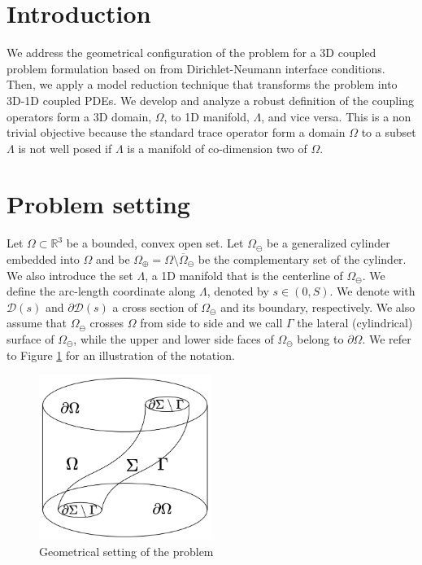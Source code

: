 \documentclass[r]{siamart171218}
\begin{document}
\section{Introduction}\label{sec:intro}

We address the geometrical configuration of the problem for a 3D coupled problem formulation based on from Dirichlet-Neumann interface conditions. Then, we apply a model reduction technique that transforms the problem into 3D-1D coupled PDEs. We develop and analyze a robust definition of the coupling operators form a 3D domain, $\Omega$, to 1D manifold, $\Lambda$, and vice versa. This is a non trivial objective because the standard trace operator form a domain $\Omega$ to a subset $\Lambda$ is not well posed if $\Lambda$ is a manifold of co-dimension two of $\Omega$.

\section{Problem setting}\label{sec:setting}

Let $\Omega \subset \mathbb{R}^3$ be a bounded, convex open set. Let $\Omega_\ominus$ be a generalized cylinder embedded into $\Omega$ and be $\Omega_\oplus = \Omega \setminus \overline{\Omega}_\ominus$ be the complementary set of the cylinder. We also introduce the set $\Lambda$, a 1D manifold that is the centerline of $\Omega_\ominus$. We define the arc-length coordinate along $\Lambda$, denoted by $s \in (0,S)$. We denote with $\mathcal{D}(s)$ and $\partial\mathcal{D}(s)$ a cross section of $\Omega_\ominus$ and its boundary, respectively. 
We also assume that $\Omega_\ominus$ crosses $\Omega$ from side to side and we call $\Gamma$ the lateral (cylindrical) surface of $\Omega_\ominus$, while the upper and lower side faces of $\Omega_\ominus$ belong to $\partial\Omega$. We refer to Figure \ref{fig1} for an illustration of the notation. 

\begin{figure}
\begin{center}
\includegraphics[width=0.5\textwidth]{3D-1D-simple.png}
\end{center}
\caption{Geometrical setting of the problem}
\label{fig1}
\end{figure}
\end{document}
